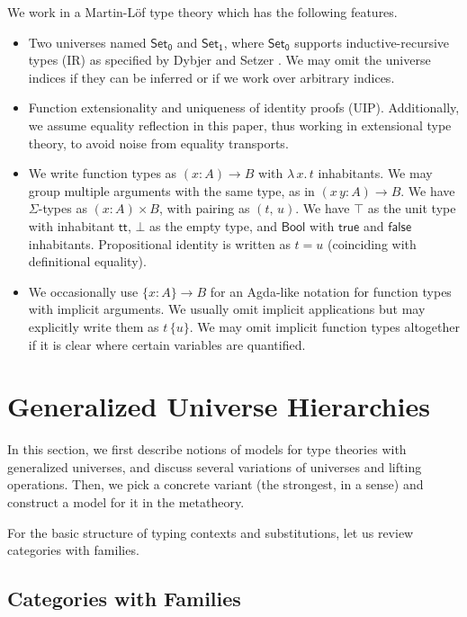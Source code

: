 \documentclass[a4paper,UKenglish,cleveref, autoref, thm-restate]{lipics-v2021}
\theoremstyle{remark}
\theoremstyle{definition}
\newcommand{\Set}[1]{\mathsf{Set_{#1}}}
\newcommand{\Bool}{\mathsf{Bool}}
\newcommand{\true}{\mathsf{true}}
\newcommand{\false}{\mathsf{false}}
\renewcommand{\tt}{\mathsf{tt}}
\begin{document}
We work in a Martin-Löf type theory which has the following features.
\begin{itemize}
  \item Two universes named $\Set0$ and $\Set1$, where $\Set0$ supports inductive-recursive types
    (IR) as specified by Dybjer and Setzer \cite{dybjer99finite}. We may omit the universe indices
    if they can be inferred or if we work over arbitrary indices.
  \item Function extensionality and uniqueness of identity proofs
    (UIP). Additionally, we assume equality reflection in this paper, thus
    working in extensional type theory, to avoid noise from equality transports.
  \item We write function types as $(x : A)\to B$ with $\lambda\,x.\,t$ inhabitants. We may group
    multiple arguments with the same type, as in $(x\,y : A) \to B$.  We have $\Sigma$-types as $(x :
    A) \times B$, with pairing as $(t,\, u)$.  We have $\top$ as the unit type with inhabitant
    $\tt$, $\bot$ as the empty type, and $\Bool$ with $\true$ and $\false$
    inhabitants. Propositional identity is written as $t = u$ (coinciding with definitional
    equality).
  \item We occasionally use $\{x : A\} \to B$ for an Agda-like notation for
    function types with implicit arguments. We usually omit implicit
    applications but may explicitly write them as $t\,\{u\}$.  We may omit
    implicit function types altogether if it is clear where certain variables
    are quantified.
\end{itemize}

\section{Generalized Universe Hierarchies}
\label{sec:ttgu}

In this section, we first describe notions of models for type theories with
generalized universes, and discuss several variations of universes and lifting
operations. Then, we pick a concrete variant (the strongest, in a sense)
and construct a model for it in the metatheory.

For the basic structure of typing contexts and substitutions, let us review
categories with families.

\subsection{Categories with Families}
\label{sec:categories_with_families}
\end{document}
